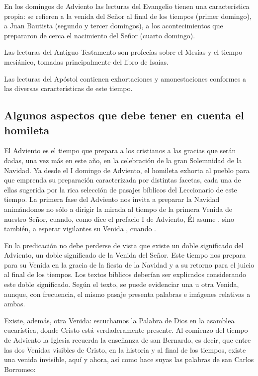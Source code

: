 \begin{introstyle}
	En los domingos de Adviento las lecturas\label{fn4} del Evangelio tienen una característica propia: se refieren a la venida del Señor al final de los tiempos (primer domingo), a Juan Bautista (segundo y tercer domingos), a
	los acontecimientos que prepararon de cerca el nacimiento del Señor (cuarto domingo).
	
	Las lecturas del Antiguo Testamento son profecías sobre el Mesías y el tiempo mesiánico, tomadas principalmente del libro de Isaías.
	
	Las lecturas del Apóstol contienen exhortaciones y amonestaciones conformes a las diversas características de este tiempo.
	
	\subsection{Algunos aspectos que debe tener en cuenta el homileta}
	
	El Adviento es el tiempo que prepara a los cristianos a las gracias que serán dadas, una vez más en este año, en la celebración de la gran Solemnidad de la Navidad. Ya desde el I domingo de Adviento, el homileta exhorta al pueblo para que emprenda su preparación caracterizada por distintas facetas, cada una de ellas sugerida por la rica selección de pasajes bíblicos del Leccionario de este tiempo. La primera fase del Adviento nos invita a preparar la Navidad animándonos no sólo a dirigir la mirada al tiempo de la primera Venida de nuestro Señor, cuando, como dice el prefacio I de Adviento, Él asume , sino también, a esperar vigilantes su Venida , cuando \label{fn5}.
	
	En la predicación no debe perderse de vista que existe un doble significado del Adviento, un doble significado de la Venida del Señor. Este tiempo nos prepara para su Venida en la gracia de la fiesta de la Navidad y a su retorno para el juicio al final de los tiempos. Los textos bíblicos deberían ser explicados considerando este doble significado. Según el texto, se puede evidenciar una u otra Venida, aunque, con frecuencia, el mismo pasaje presenta palabras e imágenes relativas a ambas.
	
	Existe, además, otra Venida: escuchamos la Palabra de Dios en la asamblea eucarística, donde Cristo está verdaderamente presente. Al comienzo del tiempo de Adviento la Iglesia recuerda la enseñanza de san Bernardo, es decir, que entre las dos Venidas visibles de Cristo, en la historia y al final de los tiempos, existe una venida invisible, aquí y ahora\label{fn6}, así como hace suyas las palabras de san Carlos Borromeo:
	

\end{introstyle}
